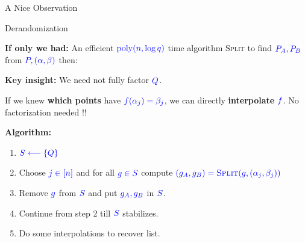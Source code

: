 \documentclass[10pt,handout]{beamer}
\DeclareMathOperator{\poly}{poly}
\begin{document}
\begin{frame}{A Nice Observation}
	 \vfill
	
	
	 \vspace{2mm}

	\hspace{1cm}  \uncover<5->{Then $\textcolor{blue}{\textcolor{blue}{Y-f(X)\mid P_A}}$.}
	\vfill

\end{frame}
\begin{frame}{Derandomization}

	\textbf{If only we had:} An efficient $\textcolor{blue}{\textcolor{blue}{\poly(n,\log q)}}$ time algorithm \textsc{Split} to find $\textcolor{blue}{\textcolor{blue}{P_A,P_B}}$ from $\textcolor{blue}{\textcolor{blue}{P, (\alpha,\beta)}}$ then:\pause\vfill

	\textbf{Key insight:} We need not fully factor $\textcolor{blue}{\textcolor{blue}{Q}}$.

	If we knew \textbf{which points} have $\textcolor{blue}{\textcolor{blue}{f(\alpha_j)=\beta_j}}$, we can directly \textbf{interpolate} $\textcolor{blue}{f}$. No factorization needed !!\pause\vfill
	
	\textbf{Algorithm:}
	\begin{enumerate}
		\item $\textcolor{blue}{\textcolor{blue}{S\longleftarrow \{Q\}}}$\pause
		\item Choose $\textcolor{blue}{\textcolor{blue}{j\in[n]}}$ and for all $\textcolor{blue}{\textcolor{blue}{g\in S}}$ compute $\textcolor{blue}{\textcolor{blue}{(g_A,g_B)=\textsc{Split}(g,(\alpha_j,\beta_j))}}$\pause
		\item Remove $\textcolor{blue}{\textcolor{blue}{g}}$ from $\textcolor{blue}{\textcolor{blue}{S}}$ and put $\textcolor{blue}{\textcolor{blue}{g_A,g_B}}$ in $\textcolor{blue}{\textcolor{blue}{S}}$.\pause
		\item Continue from step 2 till $\textcolor{blue}{\textcolor{blue}{S}}$ stabilizes.\pause
		\item Do some interpolations to recover list.
	\end{enumerate}
\end{frame}
\end{document}
